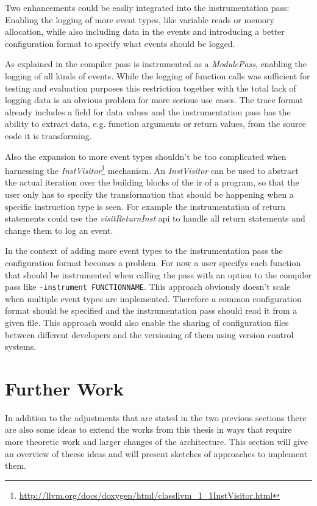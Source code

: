 Two enhancements could be easliy integrated into the instrumentation pass:
Enabling the logging of more event types, like variable reads or memory allocation, while also including data in the events and introducing a better configuration format to specify what events should be logged.

As explained in  the compiler pass is instrumented as a \emph{ModulePass}, enabling the logging of all kinds of events.
While the logging of function calls was sufficient for testing and evaluation purposes this restriction together with the total lack of logging data is an obvious problem for more serious use cases.
The trace format already includes a field for data values and the instrumentation pass has the ability to extract data, e.g. function arguments or return values, from the source code it is transforming.

Also the expansion to more event types shouldn't be too complicated when harnessing the \emph{InstVisitor}\footnote{\url{http://llvm.org/docs/doxygen/html/classllvm_1_1InstVisitor.html}} mechanism.
An \emph{InstVisitor} can be used to abstract the actual iteration over the building blocks of the \gls{ir} of a program, so that the user only has to specify the transformation that should be happening when a specific instruction type is seen.
For example the instrumentation of return statements could use the \emph{visitReturnInst} \gls{api} to handle all return statements and change them to log an event.

In the context of adding more event types to the instrumentation pass the configuration format becomes a problem.
For now a user specifys each function that should be instrumented when calling the pass with an option to the compiler pass like \lstinline{-instrument FUNCTIONNAME}.
This approach obviously doesn't scale when multiple event types are implemented.
Therefore a common configuration format should be specified and the instrumentation pass should read it from a given file.
This approach would also enable the sharing of configuration files between different developers and the versioning of them using version control systems.

\section{Further Work}
\label{sec:conclusion:further_work}

In addition to the adjustments that are stated in the two previous sections there are also some ideas to extend the works from this thesis in ways that require more theoretic work and larger changes of the architecture.
This section will give an overview of theese ideas and will present sketches of approaches to implement them.

